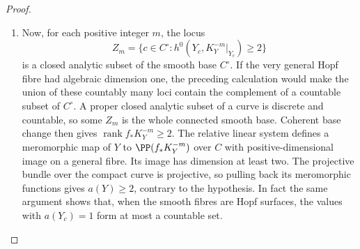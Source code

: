 \begin{proof}
\begin{enumerate}[label={$\langle1\rangle$\arabic*.},leftmargin=*]
\item Now, for each positive integer $m$, the locus
\[
Z_m=\{c\in C^\circ:
 h^0(Y_c,K_Y^{-m}|_{Y_c})\ge2\}
\]
is a closed analytic subset of the smooth base $C^\circ$.
If the very general Hopf fibre had algebraic dimension one,
the preceding calculation would make the union of these
countably many loci contain the complement of a countable
subset of $C^\circ$. A proper closed analytic subset of a
curve is discrete and countable, so some $Z_m$ is the whole
connected smooth base. Coherent base change then gives
$\operatorname{rank}f_*K_Y^{-m}\ge2$.
The relative linear system defines a meromorphic map of $Y$
to $\PP(f_*K_Y^{-m})$ over $C$ with positive-dimensional image
on a general fibre. Its image has dimension at least two.
The projective bundle over the compact curve is projective,
so pulling back its meromorphic functions gives $a(Y)\ge2$,
contrary to the hypothesis. In fact the same argument shows
that, when the smooth fibres are Hopf surfaces, the values with
$a(Y_c)=1$ form at most a countable set.

\end{enumerate}
\end{proof}